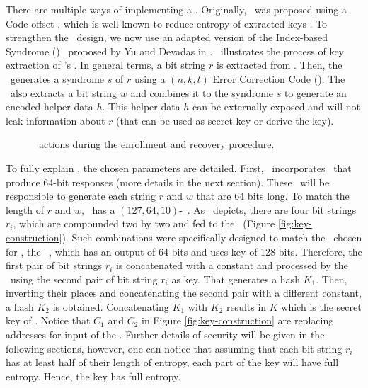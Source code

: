 There are multiple ways of implementing a \fuzzy. Originally, \cshia~was proposed using a Code-offset \fe, which is well-known to reduce entropy of extracted keys \cite{Armknecht2011:Formalization}. To strengthen the \cshia~design, we now use an adapted version of the Index-based Syndrome (\ibs) \fe~proposed by Yu and Devadas in \cite{Yu2010:RobustErrorCorrection}. \fenroll~illustrates the process of key extraction of \cshia's \fe. In general terms, a bit string $r$ is extracted from \pufs. Then, the \fe~generates a syndrome $s$ of $r$ using a $(n,k,t)$ Error Correction Code (\ecc). The \fe~also extracts a bit string $w$ and combines it to the syndrome $s$ to generate an encoded helper data $h$. This helper data $h$ can be externally exposed and will not leak information about $r$ (that can be used as secret key or derive the key).


\begin{figure*}[!ht]
	\center
	\caption{\fuzzy~actions during the enrollment and recovery procedure.}
	\label{fig:fuzzy-extractor}
\end{figure*}


To fully explain \fenroll, the chosen parameters are detailed. First, \cshia~incorporates \pufs~that produce 64-bit responses (more details in the next section). These \pufs~will be responsible to generate each string $r$ and $w$ that are 64 bits long. To match the length of $r$ and $w$, \cshia~has a $(127, 64, 10)$-\bch~\ecc. As \fenroll~depicts, there are four bit strings $r_i$, which are compounded two by two and fed to the \prf~(Figure \ref{fig:key-construction}). Such combinations were specifically designed to match the \prf~chosen for \cshia, the \siphash~\cite{Aumasson2012:SipHash}, which has an output of 64 bits and uses key of 128 bits. Therefore, the first pair of bit strings $r_i$ is concatenated with a constant and processed by the \prf~using the second pair of bit string $r_i$ as key. That generates a hash $K_1$. Then, inverting their places and concatenating the second pair with a different constant, a hash $K_2$ is obtained. Concatenating $K_1$ with $K_2$ results in $K$ which is the secret key of \cshia. Notice that $C_1$ and $C_2$ in Figure \ref{fig:key-construction} are replacing addresses for input of the \ptaggen. Further details of security will be given in the following sections, however, one can notice that assuming that each bit string $r_i$ has at least half of their length of entropy, each part of the key will have full entropy. Hence, the key has full entropy. 


